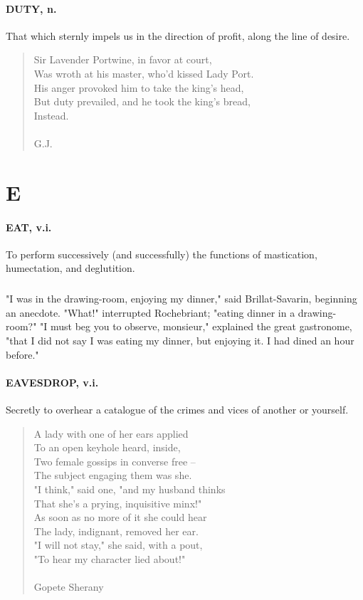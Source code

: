 \documentclass[11pt]{article}
\begin{document}
\paragraph{DUTY, n.}  That which sternly impels us in the direction of profit,
along the line of desire.

\begin{quote}   Sir Lavender Portwine, in favor at court, \\
  Was wroth at his master, who'd kissed Lady Port. \\
  His anger provoked him to take the king's head, \\
  But duty prevailed, and he took the king's bread, \\
          Instead. \\
 \\
G.J. \end{quote}




\section*{E}



\paragraph{EAT, v.i.}  To perform successively (and successfully) the functions of
mastication, humectation, and deglutition.

\subparagraph{}"I was in the drawing-room, enjoying my dinner," said Brillat-Savarin,
beginning an anecdote.  "What!" interrupted Rochebriant;
"eating dinner in a drawing-room?"  "I must beg you to observe,
monsieur," explained the great gastronome, "that I did not say I was
eating my dinner, but enjoying it.  I had dined an hour before."

\paragraph{EAVESDROP, v.i.}  Secretly to overhear a catalogue of the crimes and
vices of another or yourself.

\begin{quote}   A lady with one of her ears applied \\
  To an open keyhole heard, inside, \\
  Two female gossips in converse free -- \\
  The subject engaging them was she. \\
  "I think," said one, "and my husband thinks \\
  That she's a prying, inquisitive minx!" \\
  As soon as no more of it she could hear \\
  The lady, indignant, removed her ear. \\
  "I will not stay," she said, with a pout, \\
  "To hear my character lied about!" \\
 \\
Gopete Sherany \end{quote}
\end{document}
